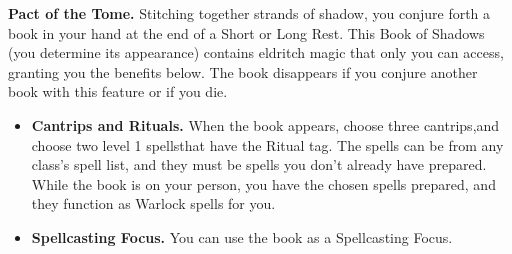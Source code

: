 \textbf{Pact of the Tome.} Stitching together strands of shadow, you conjure forth a book in your hand at the end of a Short or Long Rest. This Book of Shadows (you determine its appearance) contains eldritch magic that only you can access, granting you the benefits below. The book disappears if you conjure another book with this feature or if you die.

\begin{itemize}
\item \textbf{Cantrips and Rituals.} When the book appears, choose three cantrips,\fmark and choose two level 1 spells\fmark that have the Ritual tag. The spells can be from any class’s spell list, and they must be spells you don’t already have prepared. While the book is on your person, you have the chosen spells prepared, and they function as Warlock spells for you.

\item \textbf{Spellcasting Focus.} You can use the book as a Spellcasting Focus.
\end{itemize}


